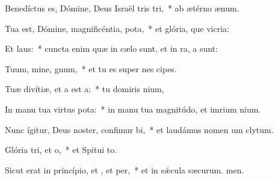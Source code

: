 \item Benedíctus es, Dómine, Deus Israël tris tri,~* ab ætérno  ænum.
\item Tua est, Dómine, magnificéntia,  pota,~* et glória, que vicria:
\item Et  laus:~* cuncta enim quæ in cælo sunt, et in ra, a sunt:
\item Tuum, mine, gnum,~* et tu es super nes cipes.
\item Tuæ divítiæ, et a est a:~* tu domiris nium,
\item In manu tua virtus  pota:~* in manu tua magnitúdo, et imrium nium.
\item Nunc ígitur, Deus noster, confimur bi,~* et laudámus nomen um clytum.
\item Glória tri, et o,~* et Spitui to.
\item Sicut erat in princípio, et , et per,~* et in sǽcula sæcurum. men.
